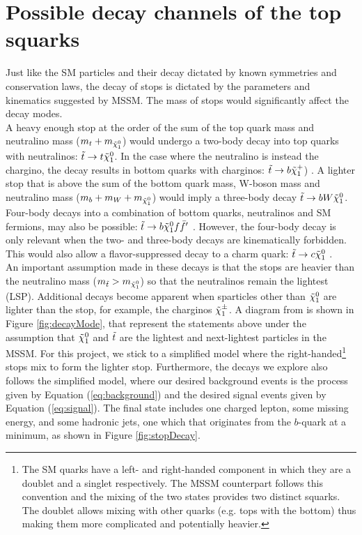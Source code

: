 \section{Possible decay channels of the top squarks} 
\label{sec:stopDecay}
Just like the SM particles and their decay dictated by known symmetries and conservation laws, the decay of stops is dictated by the parameters and kinematics suggested by MSSM. The mass of stops would significantly affect the decay modes. \\

A heavy enough stop at the order of the sum of the top quark mass and neutralino mass ($m_t+m_{\Tilde{\chi}_1^0}$) would undergo a two-body decay into top quarks with neutralinos: $\Tilde{t}\rightarrow t\Tilde{\chi}_1^0$. In the case where the neutralino is instead the chargino, the decay results in bottom quarks with charginos: $\Tilde{t}\rightarrow b\Tilde{\chi}_1^+$) \cite{boehm2000decays}. A lighter stop that is above the sum of the bottom quark mass, W-boson mass and neutralino mass ($m_b + m_W + m_{\Tilde{\chi}_1^0}$) would imply a three-body decay $\Tilde{t}\rightarrow b W \Tilde{\chi}_1^0$. Four-body decays into a combination of bottom quarks, neutralinos and SM fermions, may also be possible: $\Tilde{t}\rightarrow b\Tilde{\chi}_1^0 f \Bar{f}'$ \cite{boehm2000decays}. However, the four-body decay is only relevant when the two- and three-body decays are kinematically forbidden. This would also allow a flavor-suppressed decay to a charm quark: $\Tilde{t}\rightarrow c\Tilde{\chi}_1^0$ \cite{aad2014search}. \\

An important assumption made in these decays is that the stops are heavier than the neutralino mass ($m_{\Tilde{t}} > m_{\Tilde{\chi}_1^0} $) so that the neutralinos remain the lightest (LSP). Additional decays become apparent when sparticles other than $\Tilde{\chi}_1^0 $ are lighter than the stop, for example, the charginos $\Tilde{\chi}_1^{\pm}$. A diagram from \cite{aad2014search} is shown in Figure \ref{fig:decayMode}, that represent the statements above under the assumption that $ \Tilde{\chi}_1^0 $ and $\Tilde{t}$ are the lightest and next-lightest particles in the MSSM. For this project, we stick to a simplified model where the right-handed\footnote{The SM quarks have a left- and right-handed component in which they are a doublet and a singlet respectively. The MSSM counterpart follows this convention and the mixing of the two states provides two distinct squarks. The doublet allows mixing with other quarks (e.g. tops with the bottom) thus making them more complicated and potentially heavier.} stops mix to form the lighter stop. Furthermore, the decays we explore also follows the simplified model, where our desired background events is the process given by Equation (\ref{eq:background}) and the desired signal events given by Equation (\ref{eq:signal}). The final state includes one charged lepton, some missing energy, and some hadronic jets, one which that originates from the $b$-quark at a minimum, as shown in Figure \ref{fig:stopDecay}.\\


